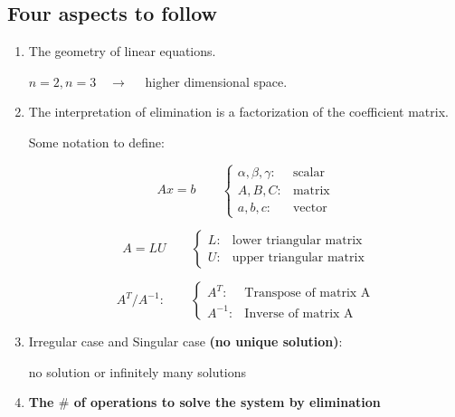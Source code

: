 \subsection{Four aspects to follow}
\begin{enumerate}[label=(\arabic*)]
    \item The geometry of linear equations.
    \begin{note}
        $n=2, n=3 \quad \rightarrow\quad$ higher dimensional space.
    \end{note}
    \item The interpretation of elimination is a factorization of the coefficient matrix.
    \begin{definition*}
        Some notation to define:
        \begin{definition}
        \[
        Ax = b \qquad
        \begin{cases}
            \alpha, \beta, \gamma: &\text{scalar} \\
            A, B, C: &\text{matrix} \\
            a, b, c: &\text{vector}
        \end{cases}        
        \]
        \end{definition}
        \begin{definition}
        \[
        A = LU \qquad
        \begin{cases}
            L: &\text{lower triangular matrix} \\
            U: &\text{upper triangular matrix}
        \end{cases}    
        \]
        \end{definition}
        \begin{definition}
        \[
        A^T/A^{-1}: \qquad
        \begin{cases}
            A^T: &\text{Transpose of matrix A} \\
            A^{-1}: &\text{Inverse of matrix A}
        \end{cases}   
        \]
        \end{definition}
    \end{definition*}

    \newpage

    \item Irregular case and Singular case \textbf{(no unique solution)}:
    \begin{note}
        no solution or infinitely many solutions
    \end{note}
    \item \textbf{The $\#$ of operations to solve the system by elimination}
\end{enumerate}

